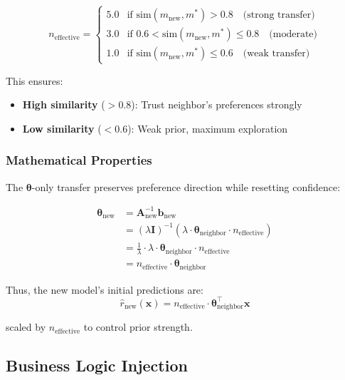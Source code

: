 \documentclass[sigconf]{acmart}
\begin{document}
\begin{equation}
n_{\text{effective}} = \begin{cases}
5.0 & \text{if } \text{sim}(m_{\text{new}}, m^*) > 0.8 \quad \text{(strong transfer)} \\
3.0 & \text{if } 0.6 < \text{sim}(m_{\text{new}}, m^*) \leq 0.8 \quad \text{(moderate)} \\
1.0 & \text{if } \text{sim}(m_{\text{new}}, m^*) \leq 0.6 \quad \text{(weak transfer)}
\end{cases}
\label{eq:n_effective}
\end{equation}

This ensures:
\begin{itemize}
    \item \textbf{High similarity} ($> 0.8$): Trust neighbor's preferences strongly
    \item \textbf{Low similarity} ($< 0.6$): Weak prior, maximum exploration
\end{itemize}

\subsubsection{Mathematical Properties}

The $\boldsymbol{\theta}$-only transfer preserves preference direction while resetting confidence:

\begin{align}
\boldsymbol{\theta}_{\text{new}} &= \mathbf{A}_{\text{new}}^{-1} \mathbf{b}_{\text{new}} \\
&= (\lambda \mathbf{I})^{-1} (\lambda \cdot \boldsymbol{\theta}_{\text{neighbor}} \cdot n_{\text{effective}}) \\
&= \frac{1}{\lambda} \cdot \lambda \cdot \boldsymbol{\theta}_{\text{neighbor}} \cdot n_{\text{effective}} \\
&= n_{\text{effective}} \cdot \boldsymbol{\theta}_{\text{neighbor}}
\label{eq:theta_preservation}
\end{align}

Thus, the new model's initial predictions are:
\begin{equation}
\hat{r}_{\text{new}}(\mathbf{x}) = n_{\text{effective}} \cdot \boldsymbol{\theta}_{\text{neighbor}}^\top \mathbf{x}
\end{equation}

scaled by $n_{\text{effective}}$ to control prior strength.

\subsection{Business Logic Injection}
\end{document}
